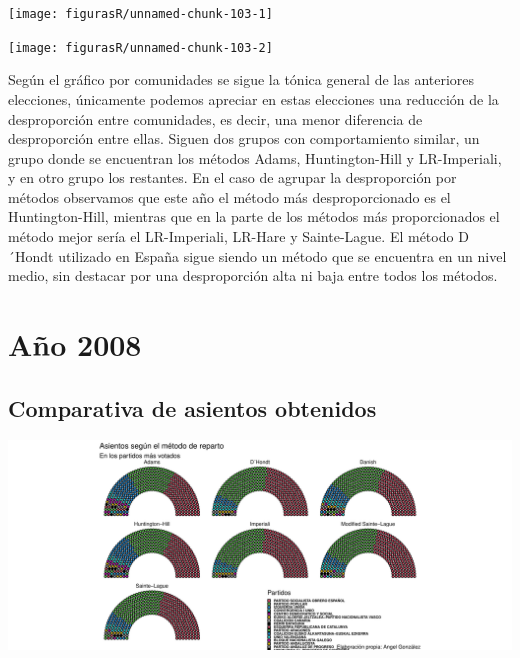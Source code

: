 \documentclass[12pt,a4paper,]{book}
\numberwithin{dummy}{section}
\theoremstyle{ocrenumbox}
\theoremstyle{blacknumex}
\theoremstyle{blacknumbox}
\theoremstyle{ocrenum}
\theoremstyle{ocrenum}
\begin{document}
\begin{center}\texttt{[image: figurasR/unnamed-chunk-103-1]} \end{center}

\begin{center}\texttt{[image: figurasR/unnamed-chunk-103-2]} \end{center}

Según el gráfico por comunidades se sigue la tónica general de las
anteriores elecciones, únicamente podemos apreciar en estas elecciones
una reducción de la desproporción entre comunidades, es decir, una menor
diferencia de desproporción entre ellas. Siguen dos grupos con
comportamiento similar, un grupo donde se encuentran los métodos Adams,
Huntington-Hill y LR-Imperiali, y en otro grupo los restantes. En el
caso de agrupar la desproporción por métodos observamos que este año el
método más desproporcionado es el Huntington-Hill, mientras que en la
parte de los métodos más proporcionados el método mejor sería el
LR-Imperiali, LR-Hare y Sainte-Lague. El método D´Hondt utilizado en
España sigue siendo un método que se encuentra en un nivel medio, sin
destacar por una desproporción alta ni baja entre todos los métodos.

\hypertarget{auxf1o-2008}{%
\section{Año 2008}\label{auxf1o-2008}}

\hypertarget{comparativa-de-asientos-obtenidos-9}{%
\subsection{Comparativa de asientos
obtenidos}\label{comparativa-de-asientos-obtenidos-9}}

\begin{center}\includegraphics[width=1\linewidth]{figurasR/unnamed-chunk-105-1} \end{center}
\end{document}
